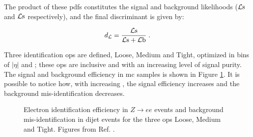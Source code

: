 The product of these \glspl{pdf} constitutes the 
signal and background likelihoods ($\mathcal{L}\rm s$ and $\mathcal{L}\rm s$ respectively), and the final discriminant is given by:

\begin{equation}
 d_\mathcal{L} = \frac{\mathcal{L}\rm s}{\mathcal{L}\rm s + \mathcal{L}\rm b} \; .
\end{equation} 

Three identification \glspl{op} are defined, Loose, Medium and Tight, optimized in bins of $|\eta|$ and \et;
these \glspl{op} are inclusive and with an increasing level of signal purity.
The signal and background efficiency in \gls{mc} samples is shown in Figure \ref{fig:obj:ele_eff}. It is possible to notice how, with increasing
\et, the signal efficiency increases and the background mis-identification decreases.
 
\begin{figure}[h]
\begin{center}
\end{center}
 \caption{ Electron identification efficiency in $Z\rightarrow e e$ events and  background mis-identification in dijet events for the three \glspl{op} Loose, Medium and Tight. Figures from Ref. \cite{ATLAS:2016iqc}.
 }
  \label{fig:obj:ele_eff}
\end{figure}



